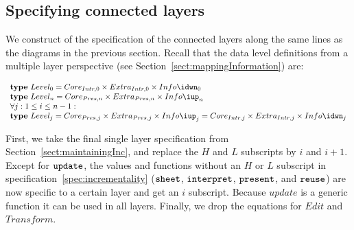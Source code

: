\subsection{Specifying connected layers}

We construct of the specification of the connected layers along the same lines as the diagrams in the previous section. Recall that the data level definitions from a multiple layer perspective (see Section~\ref{sect:mappingInformation}) are:

\begin{small}\( \begin{array}{lcl}  \label{inv:incrementality}
\text{\bf type}~Level_{0}  =  Core_{Intr,0} \times Extra_{Intr,0} \times Info\idwn_{0} \\
\text{\bf type}~Level_{n}  =  Core_{Pres,n} \times Extra_{Pres,n} \times  Info\iup_{n}\\
\lefteqn{\forall j:1 \le i \le n-1:}  \\
\text{\bf type}~Level_{j} =  Core_{Pres,j} \times Extra_{Pres,j}  \times Info\iup_{j}   
                                       =  Core_{Intr,j} \times Extra_{Intr,j} \times Info\idwn_{j}
\end{array}\)\end{small}

First, we take the  final single layer specification from Section~\ref{sect:maintainingInc}, and replace the $H$ and $L$ subscripts by $i$ and $i+1$. Except for ${\tt update}$, the values and functions without an $H$ or $L$ subscript in specification~\ref{spec:incrementality} (${\tt sheet}$, ${\tt interpret}$, ${\tt present}$, and
 ${\tt reuse}$) are now specific to a certain layer and get an $i$ subscript. Because $update$ is a generic function it can be used in all layers. Finally, we drop the equations for $Edit$ and $Transform$.

